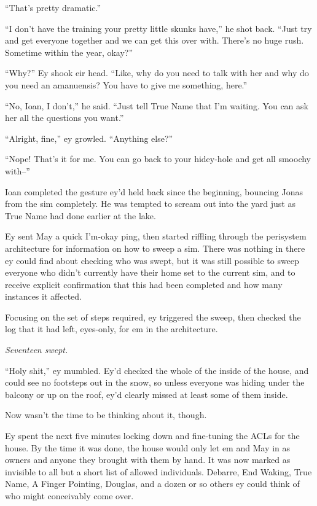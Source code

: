 ``That's pretty dramatic.''

``I don't have the training your pretty little skunks have,'' he shot back. ``Just try and get everyone together and we can get this over with. There's no huge rush. Sometime within the year, okay?''

``Why?'' Ey shook eir head. ``Like, why do you need to talk with her and why do you need an amanuensis? You have to give me something, here.''

``No, Ioan, I don't,'' he said. ``Just tell True Name that I'm waiting. You can ask her all the questions you want.''

``Alright, fine,'' ey growled. ``Anything else?''

``Nope! That's it for me. You can go back to your hidey-hole and get all smoochy with--''

Ioan completed the gesture ey'd held back since the beginning, bouncing Jonas from the sim completely. He was tempted to scream out into the yard just as True Name had done earlier at the lake.

Ey sent May a quick I'm-okay ping, then started riffling through the perisystem architecture for information on how to sweep a sim. There was nothing in there ey could find about checking who was swept, but it was still possible to sweep everyone who didn't currently have their home set to the current sim, and to receive explicit confirmation that this had been completed and how many instances it affected.

Focusing on the set of steps required, ey triggered the sweep, then checked the log that it had left, eyes-only, for em in the architecture.

\emph{Seventeen swept.}

``Holy shit,'' ey mumbled. Ey'd checked the whole of the inside of the house, and could see no footsteps out in the snow, so unless everyone was hiding under the balcony or up on the roof, ey'd clearly missed at least some of them inside.

Now wasn't the time to be thinking about it, though.

Ey spent the next five minutes locking down and fine-tuning the ACLs for the house. By the time it was done, the house would only let em and May in as owners and anyone they brought with them by hand. It was now marked as invisible to all but a short list of allowed individuals. Debarre, End Waking, True Name, A Finger Pointing, Douglas, and a dozen or so others ey could think of who might conceivably come over.

